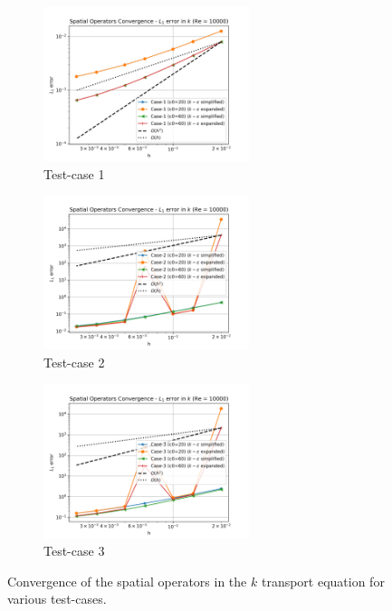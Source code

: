 \begin{figure}[H]
  \begin{subfigure}{7cm}
    \centering\includegraphics[width=6cm]{Code-Figures/keps/keps-op-conv/k_conv_tc_1_re_10000.png}
    \caption{Test-case 1}
  \end{subfigure}
  \begin{subfigure}{7cm}
    \centering\includegraphics[width=6cm]{Code-Figures/keps/keps-op-conv/k_conv_tc_2_re_10000.png}
    \caption{Test-case 2}
  \end{subfigure}
  \begin{subfigure}{7cm}
    \centering\includegraphics[width=6cm]{Code-Figures/keps/keps-op-conv/k_conv_tc_3_re_10000.png}
    \caption{Test-case 3}
  \end{subfigure}
  \caption{Convergence of the spatial operators in the $k$ transport equation for various test-cases.}
  \label{fig:k-spatial-ooc}
\end{figure}

